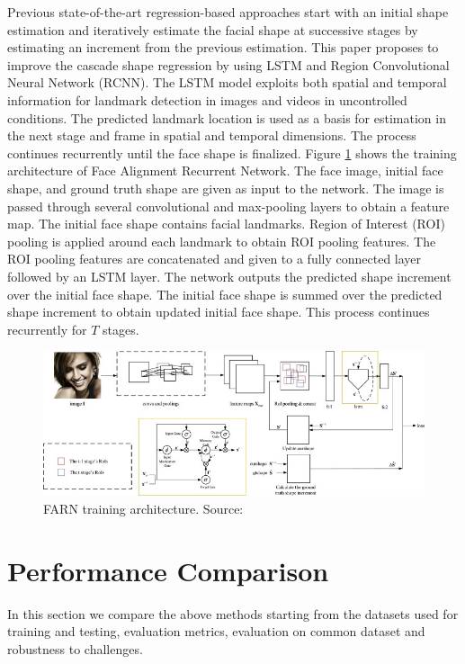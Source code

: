 \documentclass{llncs}
\begin{document}
Previous state-of-the-art regression-based approaches start with an initial shape estimation and iteratively estimate the facial shape at successive stages by estimating an increment from the previous estimation. This paper proposes to improve the cascade shape regression by using LSTM and Region Convolutional Neural Network (RCNN). The LSTM model exploits both spatial and temporal information for landmark detection in images and videos in uncontrolled conditions. The predicted landmark location is used as a basis for estimation in the next stage and frame in spatial and temporal dimensions. The process continues recurrently until the face shape is finalized. 
Figure \ref{farn_training} shows the training architecture of Face Alignment Recurrent Network. The face image, initial face shape, and ground truth shape are given as input to the network. The image is passed through several convolutional and max-pooling layers to obtain a feature map. The initial face shape contains facial landmarks. Region of Interest (ROI) pooling is applied around each landmark to obtain ROI pooling features. The ROI pooling features are concatenated and given to a fully connected layer followed by an LSTM layer. The network outputs the predicted shape increment over the initial face shape. The initial face shape is summed over the predicted shape increment to obtain updated initial face shape. This process continues recurrently for $T$ stages.

\begin{figure}
\centering
\includegraphics[scale=0.5]{Media/farn_training}
\caption{FARN training architecture. Source:\cite{farn}}
\label{farn_training}
\end{figure}



\section{Performance Comparison}
In this section we compare the above methods starting from the datasets used for training and testing, evaluation metrics, evaluation on common dataset and robustness to challenges.
\end{document}
